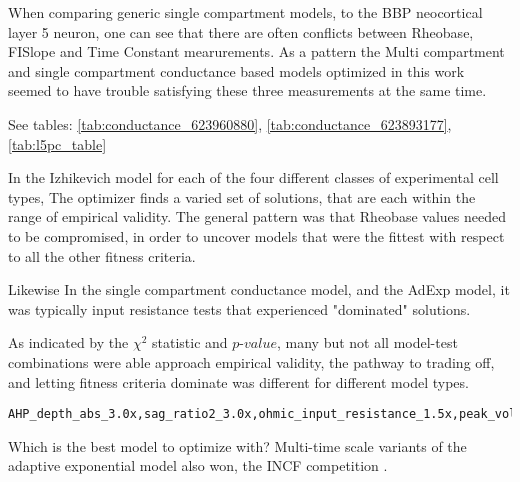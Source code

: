 When comparing generic single compartment models, to the BBP neocortical layer 5 neuron, one can see that there are often conflicts between Rheobase, FISlope and Time Constant mearurements. As a pattern the Multi compartment and single compartment conductance based models optimized in this work seemed to have trouble satisfying these three measurements at the same time.

See tables: \ref{tab:conductance_623960880}, \ref{tab:conductance_623893177}, \ref{tab:l5pc_table}





In the Izhikevich model for each of the four different classes of experimental cell types, The optimizer finds a varied set of solutions, that are each within the range of empirical validity. The general pattern was that Rheobase values needed to be compromised, in order to uncover models that were the fittest with respect to all the other fitness criteria.

Likewise In the single compartment conductance model, and the AdExp model, it was typically input resistance tests that experienced "dominated" solutions. 

As indicated by the $\chi^{2}$ statistic and $p$-$value$, many but not all model-test combinations were able approach empirical validity, the pathway to trading off, and letting fitness criteria dominate was different for different model types.




\begin{verbatim}
AHP_depth_abs_3.0x,sag_ratio2_3.0x,ohmic_input_resistance_1.5x,peak_voltage_3.0x,voltage_base_3.0x,Spikecount_3.0x,ohmic_input_resistance_vb_ssse_1.5x. 
\end{verbatim}



Which is the best model to optimize with?
Multi-time scale variants of the adaptive exponential model also won, the INCF competition \cite{incf_multi}.

